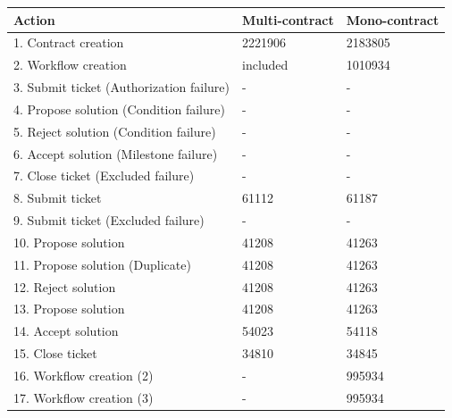 \documentclass{article}
\begin{document}
		\begin{tabular}{| l | l | l |}
			\hline
			Action 										& Multi-contract & Mono-contract \\ \hline
			1. Contract creation						& 2221906		 & 2183805 	\\\hline
			2. Workflow creation						& included 		 & 1010934 	\\\hline
			3. Submit ticket (Authorization failure)	& -				 & - 		\\\hline
			4. Propose solution (Condition failure)		& -				 & - 		\\\hline
			5. Reject solution (Condition failure)		& -				 & - 		\\\hline
			6. Accept solution (Milestone failure)		& -				 & - 		\\\hline
			7. Close ticket (Excluded failure)			& -				 & - 		\\\hline
			8. Submit ticket							& 61112			 & 61187 	\\\hline
			9. Submit ticket (Excluded failure)			& -				 & - 		\\\hline
			10. Propose solution						& 41208			 & 41263 	\\\hline
			11. Propose solution (Duplicate)			& 41208			 & 41263 	\\\hline
			12. Reject solution							& 41208			 & 41263 	\\\hline
			13. Propose solution						& 41208			 & 41263 	\\\hline
			14. Accept solution							& 54023			 & 54118 	\\\hline
			15. Close ticket							& 34810			 & 34845 	\\\hline
			16. Workflow creation (2)					& -				 & 995934 	\\\hline
			17. Workflow creation (3)					& -				 & 995934 	\\\hline
			\hline
		\end{tabular}

		\pagebreak
\end{document}
